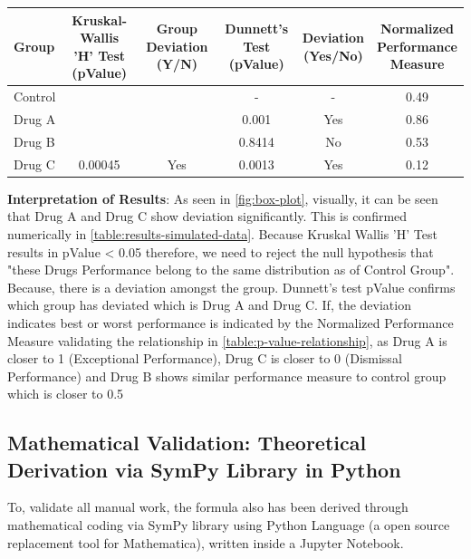 \documentclass[a4paper,fleqn,review]{cas-sc}
\begin{document}
\begin{center}
	\begin{tabular}{lccccc}
		\toprule
		\textbf{Group} &
		\makecell{\textbf{Kruskal-Wallis} \\ \textbf{'H' Test (pValue)}} &
		\makecell{\textbf{Group} \\ \textbf{Deviation (Y/N)}} &
		\makecell{\textbf{Dunnett's} \\ \textbf{Test (pValue)}} &
		\makecell{\textbf{Deviation} \\ \textbf{(Yes/No)}} &
		\makecell{\textbf{Normalized} \\ \textbf{Performance} \\ \textbf{Measure}} \\
		\midrule
		Control &         &     & -      & -    & 0.49 \\
		Drug A  &         &     & 0.001  & Yes  & 0.86 \\
		Drug B  &         &     & 0.8414 & No   & 0.53 \\
		Drug C  & \multirow{-3}{*}{0.00045} & \multirow{-3}{*}{Yes} & 0.0013 & Yes & 0.12 \\
		\bottomrule
	\end{tabular}
	\vspace{5pt}
	\label{table:results-simulated-data}
\end{center}

\textbf{Interpretation of Results}:
As seen in  \autoref{fig:box-plot}, visually, it can be seen that Drug A and Drug C show deviation significantly. This is confirmed numerically in \autoref{table:results-simulated-data}. Because Kruskal Wallis 'H' Test results in pValue < 0.05 therefore, we need to reject the null hypothesis that "these Drugs Performance belong to the same distribution as of Control Group". Because, there is a deviation amongst the group. Dunnett's test pValue confirms which group has deviated which is Drug A and Drug C. If, the deviation indicates best or worst performance is indicated by the Normalized Performance Measure validating the relationship in \autoref{table:p-value-relationship}, as Drug A is closer to 1 (Exceptional Performance), Drug C is closer to 0 (Dismissal Performance) and Drug B shows similar performance measure to control group which is closer to 0.5

\subsection{Mathematical Validation: Theoretical Derivation via SymPy Library in Python}
To, validate all manual work, the formula also has been derived through mathematical coding via SymPy library using Python Language (a open source replacement tool for Mathematica), written inside a Jupyter Notebook.
\end{document}
